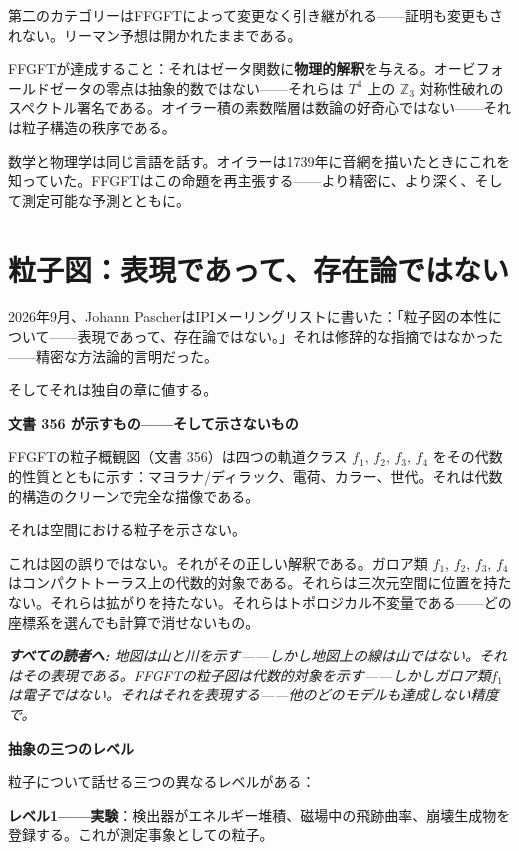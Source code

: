 \documentclass[11pt,openany]{book}
\newenvironment{laierspur}{%
  \par\vspace{4pt}%
  \noindent\small\itshape\color{blue!60!black}%
  \textbf{すべての読者へ:}\enspace\ignorespaces}{%
  \par\vspace{4pt}\normalsize\normalfont\normalcolor}
\begin{document}
第二のカテゴリーはFFGFTによって変更なく引き継がれる——証明も変更もされない。リーマン予想は開かれたままである。

FFGFTが達成すること：それはゼータ関数に\textbf{物理的解釈}を与える。オービフォールドゼータの零点は抽象的数ではない——それらは $T^4$ 上の $\mathbb{Z}_3$ 対称性破れのスペクトル署名である。オイラー積の素数階層は数論の好奇心ではない——それは粒子構造の秩序である。

数学と物理学は同じ言語を話す。オイラーは1739年に音網を描いたときにこれを知っていた。FFGFTはこの命題を再主張する——より精密に、より深く、そして測定可能な予測とともに。

\medskip

\chapter{粒子図：表現であって、存在論ではない}

2026年9月、Johann PascherはIPIメーリングリストに書いた：「粒子図の本性について——表現であって、存在論ではない。」それは修辞的な指摘ではなかった——精密な方法論的言明だった。

そしてそれは独自の章に値する。

\textbf{文書 356 が示すもの——そして示さないもの}

FFGFTの粒子概観図（文書 356）は四つの軌道クラス {$f_1$, $f_2$, $f_3$, $f_4$} をその代数的性質とともに示す：マヨラナ/ディラック、電荷、カラー、世代。それは代数的構造のクリーンで完全な描像である。

それは空間における粒子を示さない。

これは図の誤りではない。それがその正しい解釈である。ガロア類 {$f_1$, $f_2$, $f_3$, $f_4$} はコンパクトトーラス上の代数的対象である。それらは三次元空間に位置を持たない。それらは拡がりを持たない。それらはトポロジカル不変量である——どの座標系を選んでも計算で消せないもの。

\begin{laierspur}
地図は山と川を示す——しかし地図上の線は山ではない。それはその表現である。FFGFTの粒子図は代数的対象を示す——しかしガロア類$f_1$は電子ではない。それはそれを表現する——他のどのモデルも達成しない精度で。
\end{laierspur}

\textbf{抽象の三つのレベル}

粒子について話せる三つの異なるレベルがある：

\textbf{レベル1——実験}：検出器がエネルギー堆積、磁場中の飛跡曲率、崩壊生成物を登録する。これが測定事象としての粒子。
\end{document}
